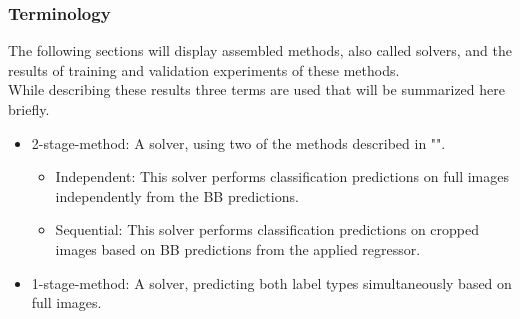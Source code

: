 \subsubsection{Terminology}
The following sections will display assembled methods, also called solvers, and the results of training and validation experiments of these methods.\\
While describing these results three terms are used that will be summarized here briefly.
\begin{itemize}
    \item 2-stage-method: A solver, using two of the methods described in "".
    \begin{itemize}
        \item Independent: This solver performs classification predictions on full images independently from the BB predictions.
        \item Sequential: This solver performs classification predictions on cropped images based on BB predictions from the applied regressor.
    \end{itemize}
    \item 1-stage-method: A solver, predicting both label types simultaneously based on full images.
\end{itemize}

